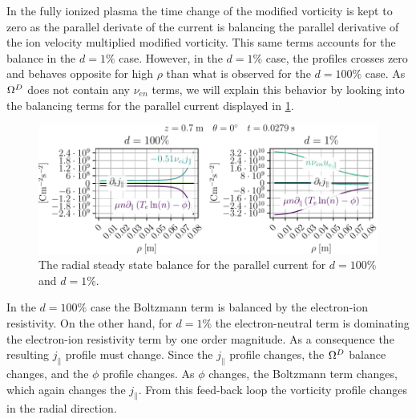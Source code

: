 %
In the fully ionized plasma the time change of the modified vorticity is kept to zero as the parallel derivate of the current is balancing the parallel derivative of the ion velocity multiplied modified vorticity.
This same terms accounts for the balance in the $d=1\%$ case.
However, in the $d=1\%$ case, the profiles crosses zero and behaves opposite for high $\rho$ than what is observed for the $d=100\%$ case.
As $\Omega^D$ does not contain any $\nu_{en}$ terms, we will explain this behavior by looking into the balancing terms for the parallel current displayed in \cref{fig:nnScanJParRad}.
%
\begin{figure}[htb]
    \centering
    \includegraphics{fig/results/neutral/jParBalanceNnCompareRad}
    \caption{The radial steady state balance for the parallel current for $d=100\%$ and $d=1\%$.}
    \label{fig:nnScanJParRad}
\end{figure}
%
In the $d=100\%$ case the Boltzmann term is balanced by the electron-ion resistivity.
On the other hand, for $d=1\%$ the electron-neutral term is dominating the electron-ion resistivity term by one order magnitude.
As a consequence the resulting $j_\|$ profile must change.
Since the $j_\|$ profile changes, the $\Omega^D$ balance changes, and the $\phi$ profile changes.
As $\phi$ changes, the Boltzmann term changes, which again changes the $j_\|$.
From this feed-back loop the vorticity profile changes in the radial direction.

